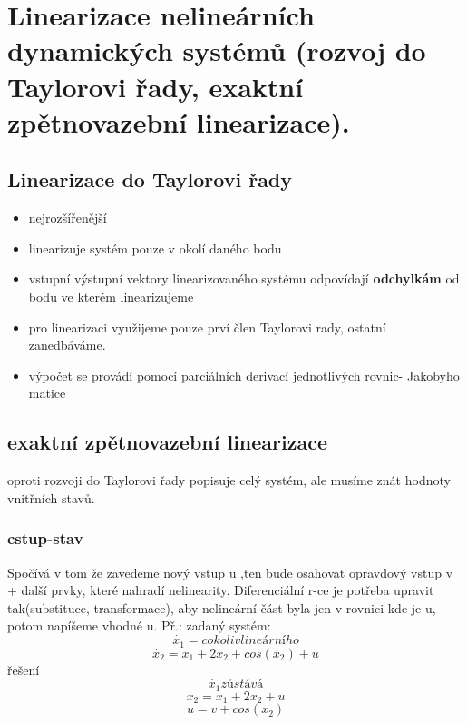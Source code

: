 \section{Linearizace nelineárních dynamických systémů (rozvoj do Taylorovi řady, exaktní zpětnovazební
  linearizace).
 }

\subsection{Linearizace do Taylorovi řady}
\begin{itemize}
    \item nejrozšířenější
    \item linearizuje systém pouze v okolí daného bodu
    \item vstupní výstupní vektory linearizovaného systému odpovídají { \bf odchylkám} od bodu ve kterém linearizujeme
    \item pro linearizaci využijeme pouze prví člen Taylorovi rady, ostatní zanedbáváme.
    \item výpočet se provádí pomocí parciálních derivací jednotlivých rovnic- Jakobyho matice
\end{itemize}

\subsection{exaktní zpětnovazební linearizace}
oproti rozvoji do Taylorovi řady popisuje celý systém, ale musíme znát hodnoty vnitřních stavů.
\subsubsection{cstup-stav}
Spočívá v tom že zavedeme nový vstup u ,ten bude osahovat opravdový vstup v + další prvky, které nahradí nelinearity.
Diferenciální r-ce je potřeba upravit tak(substituce, transformace), aby nelineární část byla jen v rovnici kde je u, potom napíšeme vhodné u.
Př.:
zadaný systém:
\begin{equation}
    \dot{x_1}=cokoliv lineárního
\end{equation}
\begin{equation*}
    \dot{x_2}=x_1+2x_2+cos(x_2)+u
\end{equation*}
řešení
\begin{equation*}
    \dot{x_1}  zůstává
\end{equation*}
\begin{equation}
    \dot{x_2}=x_1+2x_2+u
\end{equation}
\begin{equation*}
    u=v+cos(x_2)
\end{equation*}

